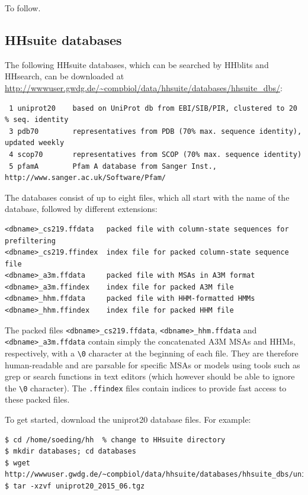 \documentclass[11pt,a4paper]{article}
\begin{document}
To follow.


\subsection{HHsuite databases} \label{hhblits_dbs}
The following HHsuite databases, which can be searched by HHblits and HHsearch, 
can be downloaded at \url{http://wwwuser.gwdg.de/~compbiol/data/hhsuite/databases/hhsuite_dbs/}: 
\small 
\begin{verbatim}
 1 uniprot20    based on UniProt db from EBI/SIB/PIR, clustered to 20 % seq. identity
 3 pdb70        representatives from PDB (70% max. sequence identity), updated weekly
 4 scop70       representatives from SCOP (70% max. sequence identity)
 5 pfamA        Pfam A database from Sanger Inst., http://www.sanger.ac.uk/Software/Pfam/
\end{verbatim} 
\normalsize

The databases consist of up to eight files, which all start with the name of the database, followed by different extensions:
\begin{verbatim}
<dbname>_cs219.ffdata   packed file with column-state sequences for prefiltering
<dbname>_cs219.ffindex  index file for packed column-state sequence file
<dbname>_a3m.ffdata     packed file with MSAs in A3M format
<dbname>_a3m.ffindex    index file for packed A3M file
<dbname>_hhm.ffdata     packed file with HHM-formatted HMMs
<dbname>_hhm.ffindex    index file for packed HHM file
\end{verbatim}

The packed files \verb`<dbname>_cs219.ffdata`, \verb`<dbname>_hhm.ffdata` and \verb`<dbname>_a3m.ffdata` contain simply the concatenated A3M MSAs and HHMs, respectively, with a \verb`\0` character at the beginning of each file. They are therefore human-readable and are parsable for specific MSAs or models using tools such as grep or search functions in text editors (which however should be able to ignore the \verb`\0` character). The \verb`.ffindex` files contain indices to provide fast access to these packed files.

To get started, download the uniprot20 database files. For example:
\begin{verbatim}
$ cd /home/soeding/hh  % change to HHsuite directory
$ mkdir databases; cd databases
$ wget http://wwwuser.gwdg.de/~compbiol/data/hhsuite/databases/hhsuite_dbs/uniprot20_2015_06.tgz
$ tar -xzvf uniprot20_2015_06.tgz
\end{verbatim}
\end{document}
